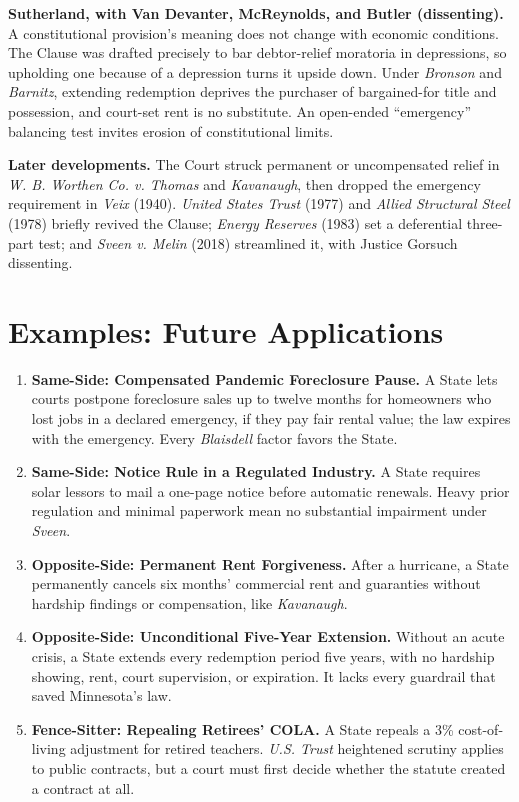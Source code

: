 \documentclass[12pt]{article}
\begin{document}
\textbf{Sutherland, with Van Devanter, McReynolds, and Butler (dissenting).} A constitutional provision's meaning does not change with economic conditions. The Clause was drafted precisely to bar debtor-relief moratoria in depressions, so upholding one because of a depression turns it upside down. Under \textit{Bronson} and \textit{Barnitz}, extending redemption deprives the purchaser of bargained-for title and possession, and court-set rent is no substitute. An open-ended ``emergency'' balancing test invites erosion of constitutional limits.

\textbf{Later developments.} The Court struck permanent or uncompensated relief in \textit{W. B. Worthen Co. v. Thomas} and \textit{Kavanaugh}, then dropped the emergency requirement in \textit{Veix} (1940). \textit{United States Trust} (1977) and \textit{Allied Structural Steel} (1978) briefly revived the Clause; \textit{Energy Reserves} (1983) set a deferential three-part test; and \textit{Sveen v. Melin} (2018) streamlined it, with Justice Gorsuch dissenting.

\section{Examples: Future Applications}

\begin{enumerate}
\item \textbf{Same-Side: Compensated Pandemic Foreclosure Pause.} A State lets courts postpone foreclosure sales up to twelve months for homeowners who lost jobs in a declared emergency, if they pay fair rental value; the law expires with the emergency. Every \textit{Blaisdell} factor favors the State.
\item \textbf{Same-Side: Notice Rule in a Regulated Industry.} A State requires solar lessors to mail a one-page notice before automatic renewals. Heavy prior regulation and minimal paperwork mean no substantial impairment under \textit{Sveen}.
\item \textbf{Opposite-Side: Permanent Rent Forgiveness.} After a hurricane, a State permanently cancels six months' commercial rent and guaranties without hardship findings or compensation, like \textit{Kavanaugh}.
\item \textbf{Opposite-Side: Unconditional Five-Year Extension.} Without an acute crisis, a State extends every redemption period five years, with no hardship showing, rent, court supervision, or expiration. It lacks every guardrail that saved Minnesota's law.
\item \textbf{Fence-Sitter: Repealing Retirees' COLA.} A State repeals a 3\% cost-of-living adjustment for retired teachers. \textit{U.S. Trust} heightened scrutiny applies to public contracts, but a court must first decide whether the statute created a contract at all.
\end{enumerate}
\end{document}
